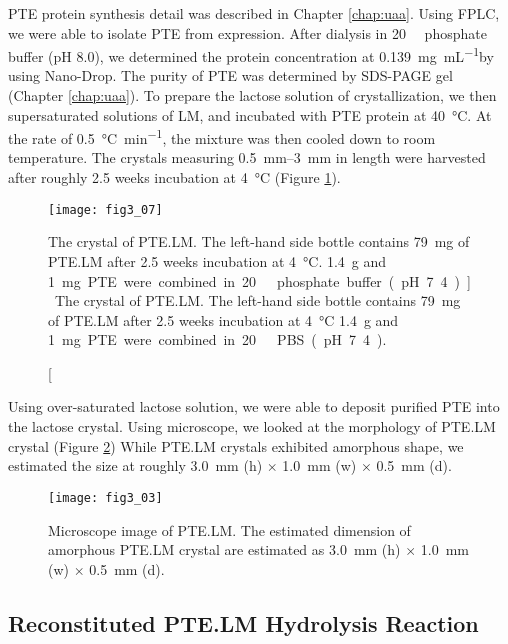 \begin{refsection}
PTE protein synthesis detail was described in Chapter \ref{chap:uaa}. Using
FPLC, we were able to isolate PTE from  expression. After
dialysis in \SI{20}{\milli\Molar} phosphate buffer (pH 8.0), we determined the
protein concentration at \SI{0.139}{\mg\per\mL}by using Nano-Drop. The purity
of PTE was determined by SDS-PAGE gel (Chapter \ref{chap:uaa}). To prepare the
lactose solution of crystallization, we then supersaturated solutions of LM,
and incubated with PTE protein at \SI{40}{\celsius}. At the rate of
\SI{0.5}{\celsius\per\minute}, the mixture was then cooled down to room
temperature. The crystals measuring \SIrange{0.5}{3}{\mm} in length were
harvested after roughly 2.5 weeks incubation at \SI{4}{\celsius} (Figure
\ref{fig:ptelm-bottle}). 
\begin{figure}[htbp] \centering \texttt{[image: fig3\_07]}
    \caption[The crystal of PTE.LM. The left-hand side bottle contains
        \SI{79}{\mg} of PTE.LM after 2.5 weeks incubation at \SI{4}{\celsius}.
\SI{1.4}{\gram} and \SI{1}mg PTE were combined in \SI{20}{\milli\Molar}
phosphate buffer (pH 7.4).]{The crystal of PTE.LM. The left-hand side bottle
    contains \SI{79}{\mg} of PTE.LM after 2.5 weeks incubation at
    \SI{4}{\celsius} \SI{1.4}{\gram} and \SI{1}mg PTE were combined in
    \SI{20}{\milli\Molar} PBS (pH 7.4).} 
    \label{fig:ptelm-bottle} 
\end{figure}

Using over-saturated lactose solution,  we were able to deposit purified PTE
into the lactose crystal. Using microscope, we looked at the morphology of
PTE.LM crystal (Figure \ref{fig:ptelm-image}) While PTE.LM crystals exhibited
amorphous shape, we estimated the size at roughly \SI{3.0}{\mm} (h) $\times$
\SI{1.0}{\mm} (w) $\times$ \SI{0.5}{\mm} (d).
\begin{figure}[h!] \centering \texttt{[image: fig3\_03]} 
    \caption[Microscope image of PTE.LM. The estimated dimension of amorphous
    PTE.LM crystal are estimated as  \SI{3.0}{\mm} (h) $\times$ \SI{1.0}{\mm}
(w) $\times$ \SI{0.5}{\mm} (d).]{Microscope image of PTE.LM. The estimated
    dimension of amorphous PTE.LM crystal are estimated as  \SI{3.0}{\mm} (h)
    $\times$ \SI{1.0}{\mm} (w) $\times$ \SI{0.5}{\mm} (d).}
    \label{fig:ptelm-image} 
\end{figure}

\subsection{Reconstituted PTE.LM Hydrolysis Reaction}


\end{refsection}

